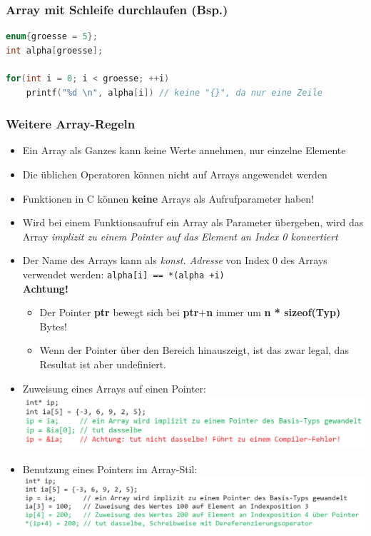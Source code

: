		\subsubsection{Array mit Schleife durchlaufen (Bsp.)}
			\begin{lstlisting}[language=C]
enum{groesse = 5};
int alpha[groesse];

for(int i = 0; i < groesse; ++i)
	printf("%d \n", alpha[i]) // keine "{}", da nur eine Zeile
			\end{lstlisting}

		\subsubsection{Weitere Array-Regeln}
			\begin{itemize}
				\item Ein Array als Ganzes kann keine Werte annehmen, nur einzelne Elemente
				\item Die üblichen Operatoren können nicht auf Arrays angewendet werden
				\item Funktionen in C können \textbf{keine} Arrays als Aufrufparameter haben!
				\item Wird bei einem Funktionsaufruf ein Array als Parameter übergeben, wird das Array \textit{implizit zu einem Pointer auf das Element an Index 0 konvertiert}
				\item Der Name des Arrays kann als \textit{konst. Adresse} von Index 0 des Arrays verwendet werden: \verb|alpha[i] == *(alpha +i)| \\
				\textbf{Achtung!}
				\begin{itemize}
					\item Der Pointer \textbf{ptr} bewegt sich bei \textbf{ptr$+$n} immer um \textbf{n * sizeof(Typ)} Bytes!
					\item Wenn der Pointer über den Bereich hinauszeigt, ist das zwar legal, das Resultat ist aber undefiniert.
				\end{itemize}
				\item Zuweisung eines Arrays auf einen Pointer:\\
				\includegraphics[height=2cm]{Bilder/arr-ptr-zuweisung.png}
				\item Benutzung eines Pointers im Array-Stil:\\
				\includegraphics[height=2cm]{Bilder/ptr-im-arr-stil.png}	
			\end{itemize}

